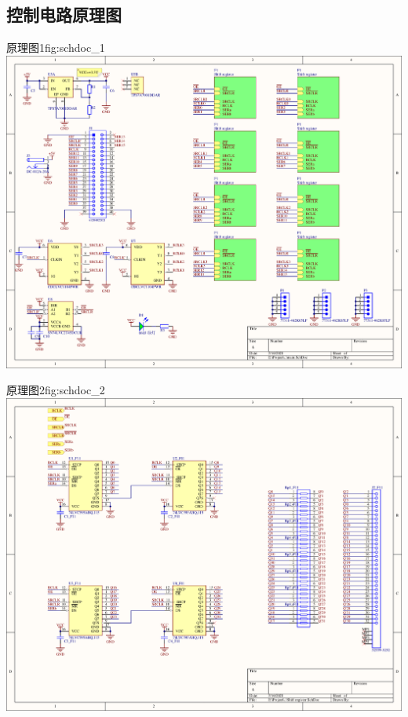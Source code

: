 \documentclass[supercite]{HustGraduPaper}
\begin{document}
\begin{appendices}

	\section{控制电路原理图}\label{sec:schdoc}

	\begin{generalfig}[htb]{原理图1}{fig:schdoc_1}
		\includegraphics[width=\linewidth]{Figures/schdoc_1.pdf}
	\end{generalfig}

	\begin{generalfig}[htb]{原理图2}{fig:schdoc_2}
		\includegraphics[width=\linewidth]{Figures/schdoc_2.pdf}
	\end{generalfig}

\end{appendices}
\end{document}
